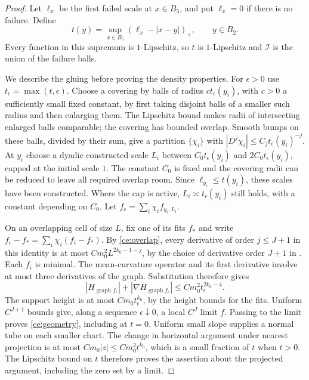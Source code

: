 \begin{proof}
Let $\ell_x$ be the first failed scale at $x\in B_5$, and put
$\ell_x=0$ if there is no failure.  Define
\begin{equation}
 \label{ce:tent}
 t(y)=\sup_{x\in B_5}(\ell_x-|x-y|)_+,
 \qquad y\in B_2.
\end{equation}
Every function in this supremum is $1$-Lipschitz, so $t$ is
$1$-Lipschitz and $\mathcal I$ is the union of the failure balls.

We describe the gluing before proving the density properties.  For
$\epsilon>0$ use $t_\epsilon=\max(t,\epsilon)$.  Choose a covering
by balls of radius $c t_\epsilon(y_i)$, with $c>0$ a sufficiently
small fixed constant, by first taking disjoint balls of a smaller
such radius and then enlarging them.  The Lipschitz bound makes
radii of intersecting enlarged balls comparable; the covering has
bounded overlap.  Smooth bumps on these balls, divided by their
sum, give a partition $\{\chi_i\}$ with
$|D^j\chi_i|\le C_jt_\epsilon(y_i)^{-j}$.
At $y_i$ choose a dyadic constructed scale $L_i$ between
$C_0t_\epsilon(y_i)$ and $2C_0t_\epsilon(y_i)$, capped at the initial
scale $1$.  The constant $C_0$ is fixed and the covering radii can be
reduced to leave all required overlap room.  Since
$\ell_{y_i}\le t(y_i)$, these scales have been constructed.
Where the cap is active, $L_i\asymp t_\epsilon(y_i)$ still holds,
with a constant depending on $C_0$.  Let
$f_\epsilon=\sum_i\chi_i f_{y_i,L_i}$.

On an overlapping cell of size $L$, fix one of its fits $f_*$ and
write $f_\epsilon-f_*=\sum_i\chi_i(f_i-f_*)$.  By
\eqref{ce:overlap}, every derivative of order $j\le J+1$ in this
identity is at most $Cm_0^2L^{2k_0-1-j}$, by the choice of derivative
order $J+1$ in .  Each $f_i$ is minimal.
The mean-curvature operator and its first derivative involve at
most three derivatives of the graph.  Substitution therefore gives
\[
 |H_{\operatorname{graph}f_\epsilon}|+
 |\nabla H_{\operatorname{graph}f_\epsilon}|
       \le Cm_0^2t_\epsilon^{2k_0-4}.
\]
The support height is at most $Cm_0t_\epsilon^{k_0}$, by the height
bounds for the fits.  Uniform $C^{J+1}$ bounds give, along a sequence
$\epsilon\downarrow0$, a local $C^J$ limit $f$.  Passing to the
limit proves \eqref{ce:geometry}, including at $t=0$.  Uniform small
slope supplies a normal tube on each smaller chart.  The change in
horizontal argument under nearest projection is at most
$Cm_0|z|\le Cm_0^2t^{k_0}$, which is a small fraction of $t$ when
$t>0$.  The Lipschitz bound on $t$ therefore proves the assertion
about the projected argument, including the zero set by a limit.


\end{proof}

